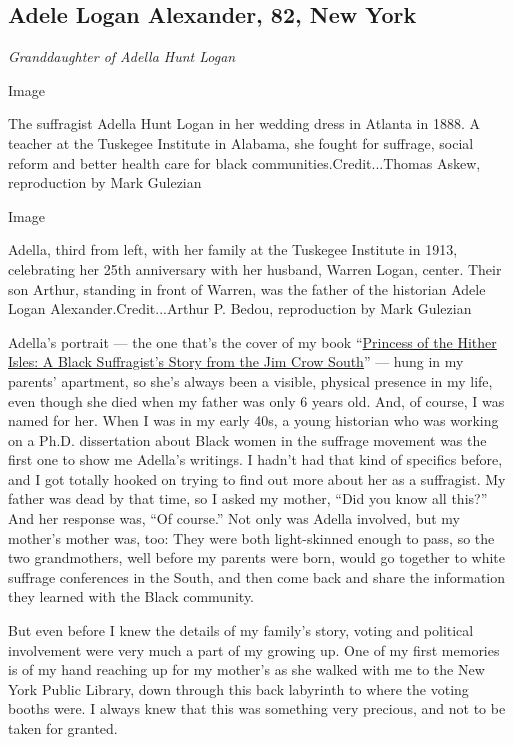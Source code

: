 \hypertarget{adele-logan-alexander-82-new-york}{%
\subsection{Adele Logan Alexander, 82, New
York}\label{adele-logan-alexander-82-new-york}}

\emph{Granddaughter of Adella Hunt Logan}

Image

The suffragist Adella Hunt Logan in her wedding dress in Atlanta in
1888. A teacher at the Tuskegee Institute in Alabama, she fought for
suffrage, social reform and better health care for black
communities.Credit...Thomas Askew, reproduction by Mark Gulezian

Image

Adella, third from left, with her family at the Tuskegee Institute in
1913, celebrating her 25th anniversary with her husband, Warren Logan,
center. Their son Arthur, standing in front of Warren, was the father of
the historian Adele Logan Alexander.Credit...Arthur P. Bedou,
reproduction by Mark Gulezian

Adella's portrait --- the one that's the cover of my book
``\href{https://yalebooks.yale.edu/book/9780300242607/princess-hither-isles}{Princess
of the Hither Isles: A Black Suffragist's Story from the Jim Crow
South}'' --- hung in my parents' apartment, so she's always been a
visible, physical presence in my life, even though she died when my
father was only 6 years old. And, of course, I was named for her. When I
was in my early 40s, a young historian who was working on a Ph.D.
dissertation about Black women in the suffrage movement was the first
one to show me Adella's writings. I hadn't had that kind of specifics
before, and I got totally hooked on trying to find out more about her as
a suffragist. My father was dead by that time, so I asked my mother,
``Did you know all this?'' And her response was, ``Of course.'' Not only
was Adella involved, but my mother's mother was, too: They were both
light-skinned enough to pass, so the two grandmothers, well before my
parents were born, would go together to white suffrage conferences in
the South, and then come back and share the information they learned
with the Black community.

But even before I knew the details of my family's story, voting and
political involvement were very much a part of my growing up. One of my
first memories is of my hand reaching up for my mother's as she walked
with me to the New York Public Library, down through this back labyrinth
to where the voting booths were. I always knew that this was something
very precious, and not to be taken for granted.

